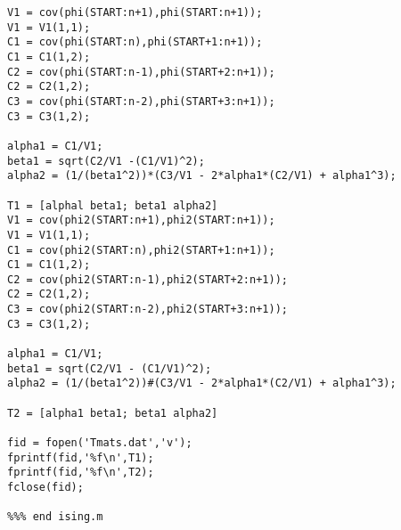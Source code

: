 {\begin{verbatim}
V1 = cov(phi(START:n+1),phi(START:n+1));
V1 = V1(1,1);
C1 = cov(phi(START:n),phi(START+1:n+1));
C1 = C1(1,2);
C2 = cov(phi(START:n-1),phi(START+2:n+1));
C2 = C2(1,2);
C3 = cov(phi(START:n-2),phi(START+3:n+1));
C3 = C3(1,2);

alpha1 = C1/V1;
beta1 = sqrt(C2/V1 -(C1/V1)^2);
alpha2 = (1/(beta1^2))*(C3/V1 - 2*alpha1*(C2/V1) + alpha1^3);

T1 = [alphal beta1; beta1 alpha2]
V1 = cov(phi2(START:n+1),phi2(START:n+1));
V1 = V1(1,1);
C1 = cov(phi2(START:n),phi2(START+1:n+1));
C1 = C1(1,2);
C2 = cov(phi2(START:n-1),phi2(START+2:n+1));
C2 = C2(1,2);
C3 = cov(phi2(START:n-2),phi2(START+3:n+1));
C3 = C3(1,2);

alpha1 = C1/V1;
beta1 = sqrt(C2/V1 - (C1/V1)^2);
alpha2 = (1/(beta1^2))#(C3/V1 - 2*alpha1*(C2/V1) + alpha1^3);

T2 = [alpha1 beta1; beta1 alpha2]

fid = fopen('Tmats.dat','v');
fprintf(fid,'%f\n',T1);
fprintf(fid,'%f\n',T2);
fclose(fid);

%%% end ising.m

\end{verbatim}}

